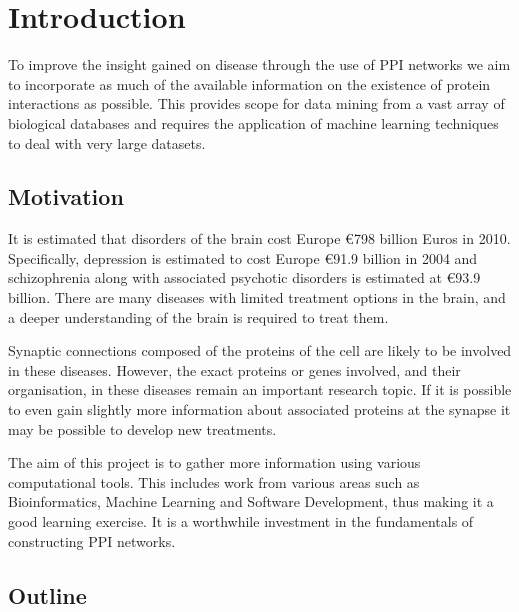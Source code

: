 \chapter{Introduction}
\label{introduction}

To improve the insight gained on disease through the use of \ac{PPI} networks we aim to incorporate as much of the available information on the existence of protein interactions as possible.
This provides scope for data mining from a vast array of biological databases and requires the application of machine learning techniques to deal with very large datasets.

\section{Motivation}

It is estimated that disorders of the brain cost Europe €798 billion Euros in 2010\autocite{olesen_economic_2012}.
Specifically, depression is estimated to cost Europe €91.9 billion in 2004 and schizophrenia along with associated psychotic disorders is estimated at €93.9 billion.
There are many diseases with limited treatment options in the brain, and a deeper understanding of the brain is required to treat them. 

Synaptic connections composed of the proteins of the cell are likely to be involved in these diseases\autocites{chua_architecture_2010,synsys}.
However, the exact proteins or genes involved, and their organisation, in these diseases remain an important research topic.
If it is possible to even gain slightly more information about associated proteins at the synapse it may be possible to develop new treatments\autocite{li_interaction_2010}.

The aim of this project is to gather more information using various computational tools.
This includes work from various areas such as Bioinformatics, Machine Learning and Software Development, thus making it a good learning exercise. %
It is a worthwhile investment in the fundamentals of constructing \ac{PPI} networks. %

\section{Outline}

